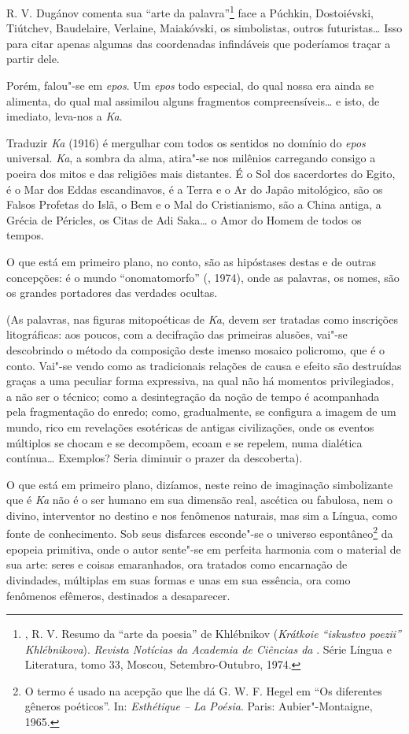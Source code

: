R. V. Dugánov comenta sua ``arte da palavra''\footnote{,
R. V. Resumo da ``arte da poesia'' de Khlébnikov (\emph{Krátkoie ``iskustvo
poezii'' Khlébnikova}). \emph{Revista Notícias da Academia de Ciências da
}. Série Língua e Literatura, tomo 33, Moscou, Setembro-Outubro,
1974.} face a Púchkin, Dostoiévski, Tiútchev, Baudelaire, Verlaine,
Maiakóvski, os simbolistas, outros futuristas\ldots{} Isso para citar
apenas algumas das coordenadas infindáveis que poderíamos traçar a partir dele.

Porém, falou"-se em \emph{epos}. Um \emph{epos} todo especial, do qual
nossa era ainda se alimenta, do qual mal assimilou alguns fragmentos
compreensíveis\ldots{} e isto, de imediato, leva-nos a \emph{Ka}.

Traduzir \emph{Ka} (1916) é mergulhar com todos os sentidos no domínio
do \emph{epos} universal. \emph{Ka}, a sombra da alma, atira"-se nos
milênios carregando consigo a poeira dos mitos e das religiões mais
distantes. É o Sol dos sacerdortes do Egito, é o Mar dos Eddas
escandinavos, é a Terra e o Ar do Japão mitológico, são os Falsos
Profetas do Islã, o Bem e o Mal do Cristianismo, são a China antiga, a
Grécia de Péricles, os Citas de Adi Saka\ldots{} o Amor do Homem de todos os
tempos.

O que está em primeiro plano, no conto, são as hipóstases destas e de
outras concepções: é o mundo ``onomatomorfo'' (, 1974), onde as
palavras, os nomes, são os grandes portadores das verdades ocultas.

(As palavras, nas figuras mitopoéticas de \emph{Ka}, devem ser tratadas
como inscrições litográficas: aos poucos, com a decifração das primeiras
alusões, vai"-se descobrindo o método da composição deste imenso mosaico
policromo, que é o conto. Vai"-se vendo como as tradicionais relações de
causa e efeito são destruídas graças a uma peculiar forma expressiva, na
qual não há momentos privilegiados, a não ser o técnico; como a
desintegração da noção de tempo é acompanhada pela fragmentação do
enredo; como, gradualmente, se configura a imagem de um mundo, rico em
revelações esotéricas de antigas civilizações, onde os eventos múltiplos
se chocam e se decompõem, ecoam e se repelem, numa dialética contínua\ldots{}
Exemplos? Seria diminuir o prazer da descoberta).

O que está em primeiro plano, dizíamos, neste reino de imaginação
simbolizante que é \emph{Ka} não é o ser humano em sua dimensão real,
ascética ou fabulosa, nem o divino, interventor no destino e nos
fenômenos naturais, mas sim a Língua, como fonte de conhecimento. Sob
seus disfarces esconde"-se o universo espontâneo\footnote{O termo é usado
  na acepção que lhe dá G. W. F. Hegel em ``Os diferentes gêneros
  poéticos''. In: \emph{Esthétique -- La Poésia}. Paris: Aubier"-Montaigne,
  1965.} da epopeia primitiva, onde o autor sente"-se em perfeita
harmonia com o material de sua arte: seres e coisas emaranhados, ora
tratados como encarnação de divindades, múltiplas em suas formas e unas
em sua essência, ora como fenômenos efêmeros, destinados a desaparecer.

